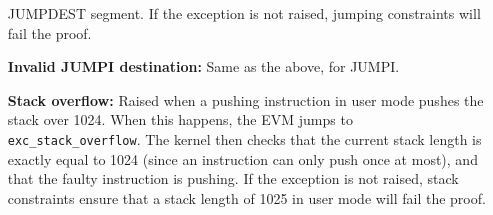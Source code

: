 \begin{enumerate}[align=left]
JUMPDEST segment.
If the exception is not raised, jumping constraints will fail the proof.
  \item[\textbf{Invalid JUMPI destination:}] Same as the above, for JUMPI.
  \item[\textbf{Stack overflow:}] Raised when a pushing instruction in user mode pushes the stack over 1024. When this happens, the EVM jumps
to \texttt{exc\_stack\_overflow}. The kernel then checks that the current stack length is exactly equal to 1024 (since an instruction can only
push once at most), and that the faulty instruction is pushing.
If the exception is not raised, stack constraints ensure that a stack length of 1025 in user mode will fail the proof.
\end{enumerate}
